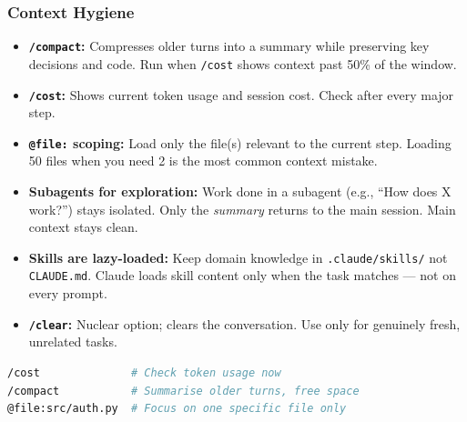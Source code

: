 \begin{frame}[fragile]\frametitle{Context Hygiene}
  \begin{itemize}
    \item \textbf{\texttt{/compact}:} Compresses older turns into a summary while preserving key decisions and code. Run when \texttt{/cost} shows context past 50\% of the window.
    \item \textbf{\texttt{/cost}:} Shows current token usage and session cost. Check after every major step.
    \item \textbf{\texttt{@file:} scoping:} Load only the file(s) relevant to the current step. Loading 50 files when you need 2 is the most common context mistake.
    \item \textbf{Subagents for exploration:} Work done in a subagent (e.g., ``How does X work?'') stays isolated. Only the \textit{summary} returns to the main session. Main context stays clean.
    \item \textbf{Skills are lazy-loaded:} Keep domain knowledge in \texttt{.claude/skills/} not \texttt{CLAUDE.md}. Claude loads skill content only when the task matches --- not on every prompt.
    \item \textbf{\texttt{/clear}:} Nuclear option; clears the conversation. Use only for genuinely fresh, unrelated tasks.
  \end{itemize}
\begin{lstlisting}[language=bash]
/cost              # Check token usage now
/compact           # Summarise older turns, free space
@file:src/auth.py  # Focus on one specific file only
\end{lstlisting}
\end{frame}


